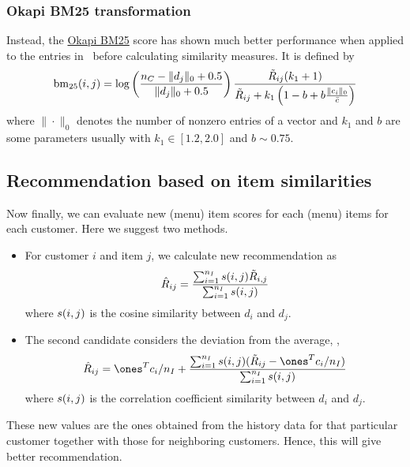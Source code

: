 \subsubsection{Okapi BM25 transformation}

Instead, the \href{https://en.wikipedia.org/wiki/Okapi_BM25}{Okapi BM25} score has shown much better performance when applied to the entries in \ratmatnorm\
before calculating similarity measures.
It is defined by
\begin{equation}
\mathrm{bm}_{25}(i,j) = \log\left(\frac{{n_C} - \|d_j\|_0 + 0.5}{\|d_j\|_0 + 0.5}\right)
\frac{\tilde{R}_{ij}(k_1+1)}{\tilde{R}_{ij} + k_1 \left(1-b+b\frac{\|c_i\|_0}{\bar{c}}\right)}
\end{equation}
where
$\|\cdot\|_0$ denotes the number of nonzero entries of a vector
and
$k_{1}$ and $b$ are some parameters usually with $k_{1}\in [1.2,2.0]$ and $b \sim 0.75$.


\subsection{Recommendation based on item similarities}

Now finally, we can evaluate new (menu) item scores for each (menu) items for each customer.
Here we suggest two methods.

\begin{itemize}
\item For customer $i$ and item $j$, we calculate new recommendation as
\begin{equation}
\hat{R}_{ij} = \frac{\sum_{i=1}^{{n_I}}s(i,j) \tilde{R}_{i,j}}{\sum_{i=1}^{{n_I}}s(i,j)}
\end{equation}
where $s(i,j)$ is the cosine similarity between $d_i$ and $d_j$.

\item The second candidate considers the deviation from the average, \ie,
\begin{equation}
\ratmatpred_{ij} =
\ones^Tc_i/\numitem
+
\frac{\sum_{i=1}^{\numitem}\simil(i,j)(\ratmatnorm_{ij}-\ones^Tc_i/\numitem) }{\sum_{i=1}^{\numitem}\simil(i,j)}
\end{equation}
where $s(i,j)$ is the correlation coefficient similarity between $d_i$ and $d_j$.
\end{itemize}


These new values are the ones obtained from the history data for that particular customer together
with those for neighboring customers. Hence, this will give better recommendation.


